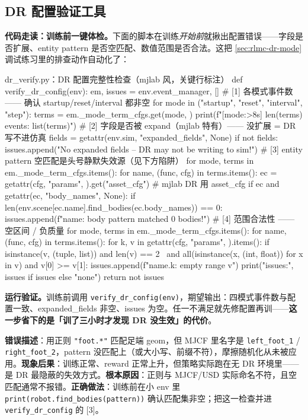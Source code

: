 \subsection{DR 配置验证工具}
\label{sec:rlmc-dr-func-verify}

\textbf{代码走读：训练前一键体检。}下面的脚本在训练\emph{开始前}就揪出配置错误——字段是否扩展、entity pattern 是否空匹配、数值范围是否合法。这把 \cref{sec:rlmc-dr-mode} 调试练习里的排查动作自动化了：

\begin{codebox}[Python]{dr\_verify.py：DR 配置完整性检查（mjlab 风，关键行标注）}
def verify_dr_config(env):
    em, issues = env.event_manager, []
    # [1] 各模式事件数 —— 确认 startup/reset/interval 都非空
    for mode in ("startup", "reset", "interval", "step"):
        terms = em._mode_term_cfgs.get(mode, {})
        print(f"[{mode:>8s}] {len(terms)} events: {list(terms)}")
    # [2] 字段是否被 expand（mjlab 特有）—— 没扩展 = DR 写不进仿真
    fields = getattr(env.sim, "expanded_fields", None)
    if not fields:
        issues.append("No expanded fields -- DR may not be writing to sim!")
    # [3] entity pattern 空匹配是头号静默失效源（见下方陷阱）
    for mode, terms in em._mode_term_cfgs.items():
        for name, (func, cfg) in terms.items():
            ec = getattr(cfg, "params", {}).get("asset_cfg")   # mjlab DR 用 asset_cfg
            if ec and getattr(ec, "body_names", None):
                if len(env.scene[ec.name].find_bodies(ec.body_names)) == 0:
                    issues.append(f"{name}: body pattern matched 0 bodies!")
    # [4] 范围合法性 —— 空区间 / 负质量
    for mode, terms in em._mode_term_cfgs.items():
        for name, (func, cfg) in terms.items():
            for k, v in getattr(cfg, "params", {}).items():
                if isinstance(v, (tuple, list)) and len(v) == 2 \
                   and all(isinstance(x, (int, float)) for x in v) and v[0] >= v[1]:
                    issues.append(f"{name}.{k}: empty range {v}")
    print("issues:", issues if issues else "none")
    return not issues
\end{codebox}

\textbf{运行验证。}训练前调用 \verb|verify_dr_config(env)|，期望输出：四模式事件数与配置一致、expanded\_fields 非空、issues 为空。任一不满足就先修配置再训——\textbf{这一步省下的是「训了三小时才发现 DR 没生效」的代价}。

\begin{pitfall}
\textbf{错误描述}：用正则 \verb|"foot.*"| 匹配足端 geom，但 MJCF 里名字是 \verb|left_foot_1| / \verb|right_foot_2|，pattern 没匹配上（或大小写、前缀不符），摩擦随机化从未被应用。\textbf{现象后果}：训练正常、reward 正常上升，但策略实际跑在无 DR 环境里——是 DR 最隐蔽的失效方式。\textbf{根本原因}：正则与 MJCF/USD 实际命名不符，且空匹配通常不报错。\textbf{正确做法}：训练前在小 env 里 \verb|print(robot.find_bodies(pattern))| 确认匹配集非空；把这一检查并进 \verb|verify_dr_config| 的 [3]。
\end{pitfall}

